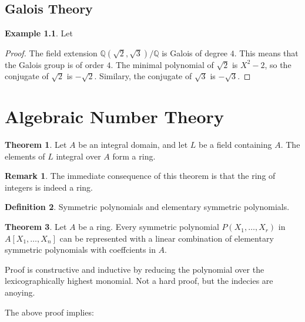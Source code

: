 \documentclass[a4paper]{book}
\theoremstyle{definition}
\newtheorem{definition}{Definition}[]
\newtheorem{example}{Example}[definition]
\newtheorem{theorem}[definition]{Theorem}
\newtheorem*{remark}{Remark}
\begin{document}
\chapter{Galois Theory}

\begin{example}
    Let \(\)
\end{example}
\begin{proof}
    The field extension \(\mathbb{Q}(\sqrt{2}, \sqrt{3}) / \mathbb{Q}\) is Galois of degree \(4\). This means that the Galois group is of order \(4\). The minimal polynomial of \(\sqrt{2}\) is \(X^2 - 2\), so the conjugate of \(\sqrt{2}\) is \(-\sqrt{2}\). Similary, the conjugate of \(\sqrt{3}\) is \(-\sqrt{3}\).
\end{proof}

\part{Algebraic Number Theory}

\begin{thmbox}
    \begin{theorem}
        Let \(A\) be an integral domain, and let \(L\) be a field containing \(A\). The elements of \(L\) integral over \(A\) form a ring.
    \end{theorem}
\end{thmbox}
\begin{remark}
    The immediate consequence of this theorem is that the ring of integers is indeed a ring.
\end{remark}
\begin{defbox}
    \begin{definition}
        Symmetric polynomials and elementary symmetric polynomials.
    \end{definition}
\end{defbox}
\begin{thmbox}
    \begin{theorem}
        Let \(A\) be a ring. Every symmetric polynomial \(P(X_1, \ldots, X_r)\) in \(A[X_1, \ldots, X_n]\) can be represented with a linear combination of elementary symmetric polynomials with coeffcients in \(A\).
    \end{theorem}
\end{thmbox}
Proof is constructive and inductive by reducing the polynomial over the lexicographically highest monomial. Not a hard proof, but the indecies are anoying.

The above proof implies:
\end{document}
